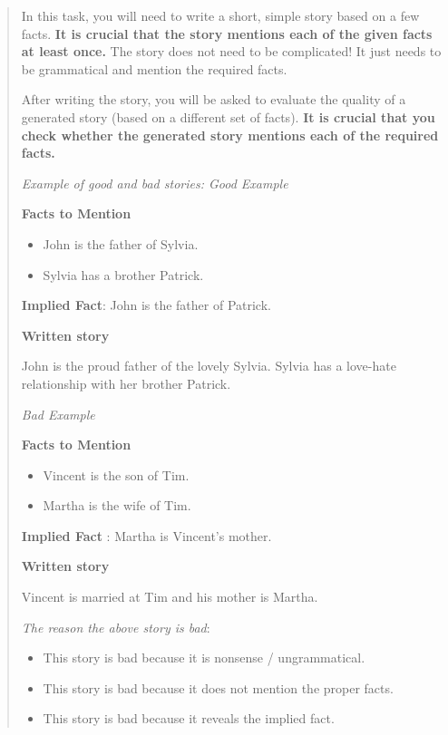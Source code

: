 \documentclass[letterpaper, 12pt]{report}
\begin{document}
\begin{quote}\small
    In this task, you will need to write a short, simple story based on a few facts. \textbf{It is crucial that the story mentions each of the given facts at least once.} The story does not need to be complicated! It just needs to be grammatical and mention the required facts.

    After writing the story, you will be asked to evaluate the quality of a generated story (based on a different set of facts). \textbf{It is crucial that you check whether the generated story mentions each of the required facts.}

    \textit{Example of good and bad stories: Good Example}

    \textbf{Facts to Mention}
    \begin{itemize}
        \item John is the father of Sylvia.
        \item Sylvia has a brother Patrick.
    \end{itemize}

    \textbf{Implied Fact}: John is the father of Patrick.

    \textbf{Written story}

    John is the proud father of the lovely Sylvia. Sylvia has a love-hate relationship with her brother Patrick.

    \textit{Bad Example}

    \textbf{Facts to Mention}

    \begin{itemize}
        \item Vincent is the son of Tim.
        \item Martha is the wife of Tim.
    \end{itemize}

    \textbf{Implied Fact} : Martha is Vincent's mother.

    \textbf{Written story}

    Vincent is married at Tim and his mother is Martha.

    \textit{The reason the above story is bad}:

    \begin{itemize}
        \item This story is bad because it is nonsense / ungrammatical.
        \item This story is bad because it does not mention the proper facts.
        \item This story is bad because it reveals the implied fact.
    \end{itemize}
\end{quote}
\end{document}
